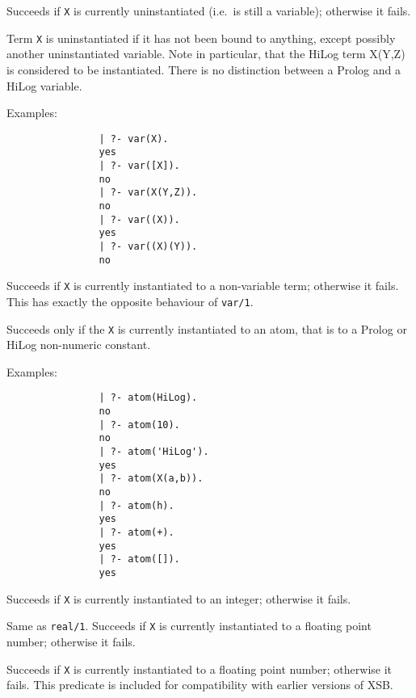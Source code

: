 \begin{description}
    Succeeds if {\tt X} is currently uninstantiated (i.e.\ is still a 
    variable); otherwise it fails.  

    Term {\tt X} is uninstantiated if it has not been bound to anything, 
    except possibly another uninstantiated variable. Note in particular,
    that the HiLog term X(Y,Z) is considered to be instantiated.  There 
    is no distinction between a Prolog and a HiLog variable.

    Examples:
    {\footnotesize
     \begin{verbatim}
                | ?- var(X).
                yes
                | ?- var([X]).
                no
                | ?- var(X(Y,Z)).
                no
                | ?- var((X)).
                yes
                | ?- var((X)(Y)).
                no
     \end{verbatim}}


    Succeeds if {\tt X} is currently instantiated to a non-variable term;
    otherwise it fails. This has exactly the opposite behaviour of 
    {\tt var/1}\@.

    Succeeds only if the {\tt X} is currently instantiated to an atom, that
    is to a Prolog or HiLog non-numeric constant.

    Examples:
    {\footnotesize
     \begin{verbatim}
                | ?- atom(HiLog).
                no
                | ?- atom(10).
                no
                | ?- atom('HiLog').
                yes
                | ?- atom(X(a,b)).
                no
                | ?- atom(h).
                yes
                | ?- atom(+).
                yes
                | ?- atom([]).
                yes
     \end{verbatim}}

    Succeeds if {\tt X} is currently instantiated to an integer; 
    otherwise it fails. 

    Same as {\tt real/1}. Succeeds if {\tt X} is currently instantiated 
    to a floating point number; otherwise it fails.  
	
%
Succeeds if {\tt X} is currently instantiated to a floating point
number; otherwise it fails. This predicate is included for
compatibility with earlier versions of XSB.


\end{description}
